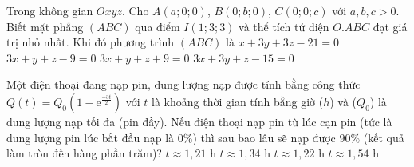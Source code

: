 \begin{ex}%
Trong không gian $Oxyz$. Cho $A(a;0;0)$, $B(0;b;0)$, $C(0;0;c)$ với $a,b,c>0$. Biết mặt phẳng $(ABC)$ qua điểm $I(1;3;3)$ và thể tích tứ diện $O.ABC$ đạt giá trị nhỏ nhất. Khi đó phương trình $(ABC)$ là
\choice
{$x+3y+3z-21=0$}
{\True $3x+y+z-9=0$}
{$3x+y+z+9=0$}
{$3x+3y+z-15=0$}
\end{ex}
\begin{ex}%
Một điện thoại đang nạp pin, dung lượng nạp được tính bằng công thức $Q(t)=Q_0\left(1-{\mathrm{e}}^{\frac{-3t}{2}}\right)$ với $t$ là khoảng thời gian tính bằng giờ ($h$) và ($Q_0$) là dung lượng nạp tối đa (pin đầy). Nếu điện thoại nạp pin từ lúc cạn pin (tức là dung lượng pin lúc bắt đầu nạp là $0\%$) thì sau bao lâu sẽ nạp được $90\%$ (kết quả làm tròn đến hàng phần trăm)?
\choice
{$t\approx 1{,}21$ h}
{$t\approx 1{,}34$ h}
{$t\approx 1{,}22$ h}
{\True $t\approx 1{,}54$ h}
\end{ex}

